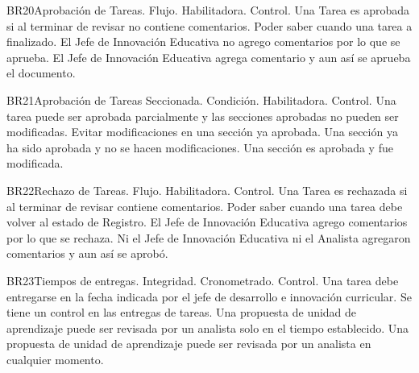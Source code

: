 \begin{BussinesRule}{BR20}{Aprobación de Tareas.}
    \BRitem[Tipo:] Flujo.
    \BRitem[Clase:] Habilitadora.
    \BRitem[Nivel:] Control.
    \BRitem[Descripción:] Una Tarea es aprobada si al terminar de revisar no contiene comentarios.
     Poder saber cuando una tarea a finalizado.
     El Jefe de Innovación Educativa no agrego comentarios por lo que se aprueba.
     El Jefe de Innovación Educativa agrega comentario y aun así se aprueba el documento.
\end{BussinesRule}
\begin{BussinesRule}{BR21}{Aprobación de Tareas Seccionada.}
    \BRitem[Tipo:] Condición.
    \BRitem[Clase:] Habilitadora.
    \BRitem[Nivel:] Control.
    \BRitem[Descripción:]
    \BRitem[Sentencia:] Una tarea puede ser aprobada parcialmente y las secciones aprobadas no pueden ser modificadas.
     Evitar modificaciones en una sección ya aprobada.
     Una sección ya ha sido aprobada y no se hacen modificaciones.
     Una sección es aprobada y fue modificada.
\end{BussinesRule}
\begin{BussinesRule}{BR22}{Rechazo de Tareas.}
    \BRitem[Tipo:] Flujo.
    \BRitem[Clase:] Habilitadora.
    \BRitem[Nivel:] Control.
    \BRitem[Descripción:] Una Tarea es rechazada si al terminar de revisar contiene comentarios.
     Poder saber cuando una tarea debe volver al estado de Registro.
     El Jefe de Innovación Educativa agrego comentarios por lo que se rechaza.
     Ni el Jefe de Innovación Educativa ni el Analista agregaron comentarios y aun así se aprobó.
\end{BussinesRule}
\begin{BussinesRule}{BR23}{Tiempos de entregas.}
    \BRitem[Tipo:] Integridad.
    \BRitem[Clase:] Cronometrado.
    \BRitem[Nivel:] Control.
    \BRitem[Descripción:] Una tarea debe entregarse en la fecha indicada por el jefe de desarrollo e innovación curricular.
     Se tiene un control en las entregas de tareas.
     Una propuesta de unidad de aprendizaje puede ser revisada por un analista solo en el tiempo establecido.
     Una propuesta de unidad de aprendizaje puede ser revisada por un analista en cualquier momento.
\end{BussinesRule}

